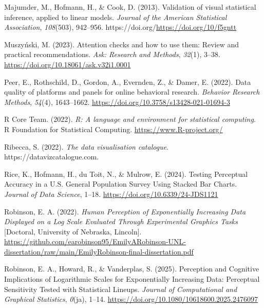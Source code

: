 \documentclass[
  10pt,
  letterpaper,
  DIV=11,
  numbers=noendperiod]{scrartcl}
\newlength{\cslhangindent}
\newenvironment{CSLReferences}[2] %
 {\begin{list}{}{%
  \setlength{\itemindent}{0pt}
  \setlength{\leftmargin}{0pt}
  \setlength{\parsep}{0pt}
  \ifodd #1
   \setlength{\leftmargin}{\cslhangindent}
   \setlength{\itemindent}{-1\cslhangindent}
  \fi
  \setlength{\itemsep}{#2\baselineskip}}}
 {\end{list}}
\begin{document}
\begin{CSLReferences}{1}{0}
Majumder, M., Hofmann, H., \& Cook, D. (2013). Validation of visual
statistical inference, applied to linear models. \emph{Journal of the
American Statistical Association}, \emph{108}(503), 942--956.
https://doi.org/\url{https://doi.org/10/f5gntt}

Muszyński, M. (2023). Attention checks and how to use them: {Review} and
practical recommendations. \emph{Ask: Research and Methods},
\emph{32}(1), 3--38. \url{https://doi.org/10.18061/ask.v32i1.0001}

Peer, E., Rothschild, D., Gordon, A., Evernden, Z., \& Damer, E. (2022).
Data quality of platforms and panels for online behavioral research.
\emph{Behavior Research Methods}, \emph{54}(4), 1643--1662.
\url{https://doi.org/10.3758/s13428-021-01694-3}

R Core Team. (2022). \emph{R: A language and environment for statistical
computing}. R Foundation for Statistical Computing.
\url{https://www.R-project.org/}

Ribecca, S. (2022). \emph{The data visualisation catalogue}.
https://datavizcatalogue.com.

Rice, K., Hofmann, H., du Toit, N., \& Mulrow, E. (2024). Testing
{Perceptual Accuracy} in a {U}.{S}. {General Population Survey Using
Stacked Bar Charts}. \emph{Journal of Data Science}, 1--18.
\url{https://doi.org/10.6339/24-JDS1121}

Robinson, E. A. (2022). \emph{Human {Perception} of {Exponentially}
{Increasing} {Data} {Displayed} on a {Log} {Scale} {Evaluated} {Through}
{Experimental} {Graphics} {Tasks}} {[}Doctoral, University of Nebraska,
Lincoln{]}.
\url{https://github.com/earobinson95/EmilyARobinson-UNL-dissertation/raw/main/EmilyRobinson-final-dissertation.pdf}

Robinson, E. A., Howard, R., \& Vanderplas, S. (2025). Perception and
{Cognitive Implications} of {Logarithmic Scales} for {Exponentially
Increasing Data}: {Perceptual Sensitivity Tested} with {Statistical
Lineups}. \emph{Journal of Computational and Graphical Statistics},
\emph{0}(ja), 1--14. \url{https://doi.org/10.1080/10618600.2025.2476097}


\end{CSLReferences}
\end{document}
